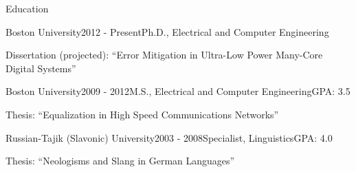 \begin {rSection} {Education}
  \begin{rSubsection}{Boston University}{2012 - Present}{Ph.D., Electrical and Computer Engineering}{}
  \item Dissertation (projected): ``Error Mitigation in Ultra-Low Power Many-Core Digital Systems''
  \end{rSubsection}
  \begin{rSubsection}{Boston University}{2009 - 2012}{M.S., Electrical and Computer Engineering}{GPA: 3.5}
  \item Thesis: ``Equalization in High Speed Communications Networks''
  \end{rSubsection}
  \begin{rSubsection}{Russian-Tajik (Slavonic) University}{2003 - 2008}{Specialist, Linguistics}{GPA: 4.0}
  \item Thesis: ``Neologisms and Slang in German Languages''
  \end{rSubsection}
\end{rSection}
